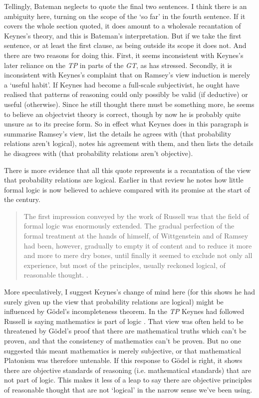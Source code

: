 \noindent Tellingly, Bateman neglects to quote the final two sentences. I think there is an ambiguity here, turning on the scope of the `so far' in the fourth sentence. If it covers the whole section quoted, it does amount to a wholesale recantation of Keynes's theory, and this is Bateman's interpretation. But if we take the first sentence, or at least the first clause, as being outside its scope it does not. And there are two reasons for doing this. First, it seems inconsistent with Keynes's later reliance on the \textit{TP} in parts of the \textit{GT}, as \cite[Ch. 6]{ODonnell1989} has stressed. Secondly, it is inconsistent with Keynes's complaint that on Ramsey's view induction is merely a `useful habit'. If Keynes had become a full-scale subjectivist, he ought have realised that patterns of reasoning could only possibly be valid (if deductive) or useful (otherwise). Since he still thought there must be something more, he seems to believe an objectvist theory is correct, though by now he is probably quite unsure as to its precise form. So in effect what Keynes does in this paragraph is summarise Ramsey's view, list the details he agrees with (that probability relations aren't logical), notes his agreement with them, and then lists the details he disagrees with (that probability relations aren't objective).

There is more evidence that all this quote represents is a recantation of the view that probability relations are logical. Earlier in that review he notes how little formal logic is now believed to achieve compared with its promise at the start of the century.

\begin{quote}
The first impression conveyed by the work of Russell was that the field of formal logic was enormously extended. The gradual perfection of the formal treatment at the hands of himself, of Wittgenstein and of Ramsey had been, however, gradually to empty it of content and to reduce it more and more to mere dry bones, until finally it seemed to exclude not only all experience, but most of the principles, usually reckoned logical, of reasonable thought. \citep[338]{Keynes1931}.
\end{quote}

\noindent More speculatively, I suggest Keynes's change of mind here (for this shows he had surely given up the view that probability relations are logical) might be influenced by G\"{o}del's incompleteness theorem. In the \textit{TP} Keynes had followed Russell is saying mathematics is part of logic \citep[293n]{Keynes1921}. That view was often held to be threatened by G\"{o}del's proof that there are mathematical truths which can't be proven, and that the consistency of mathematics can't be proven. But no one suggested this meant mathematics is merely subjective, or that mathematical Platonism was therefore untenable. If this response to G\"{o}del is right, it shows there are objective standards of reasoning (i.e. mathematical standards) that are not part of logic. This makes it less of a leap to say there are objective principles of reasonable thought that are not `logical' in the narrow sense we've been using.

